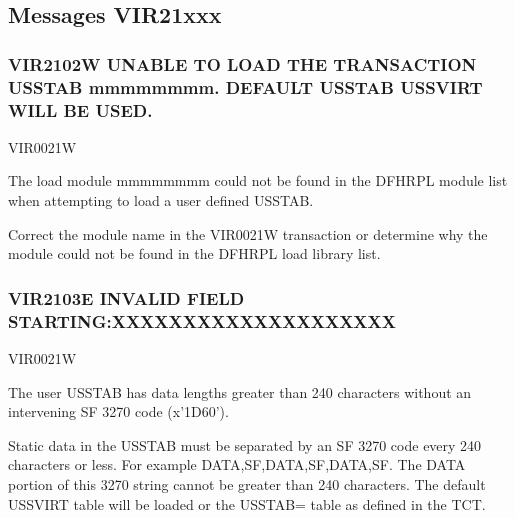 \documentclass[letterpaper,10pt,english]{sphinxmanual}
\begin{document}
\subsection{Messages VIR21xxx}
\label{\detokenize{messages:messages-vir21xxx}}

\subsubsection{VIR2102W UNABLE TO LOAD THE TRANSACTION USSTAB mmmmmmmm. DEFAULT USSTAB USSVIRT WILL BE USED.}
\label{\detokenize{messages:vir2102w-unable-to-load-the-transaction-usstab-mmmmmmmm-default-usstab-ussvirt-will-be-used}}\begin{description}
\sphinxAtStartPar
VIR0021W

\sphinxAtStartPar
The load module mmmmmmmm could not be found in the DFHRPL module list when attempting to load a user defined USSTAB.

\sphinxAtStartPar
Correct the module name in the VIR0021W transaction or determine why the module could not be found in the DFHRPL load library list.

\end{description}


\subsubsection{VIR2103E INVALID FIELD STARTING:XXXXXXXXXXXXXXXXXXXX}
\label{\detokenize{messages:vir2103e-invalid-field-starting-xxxxxxxxxxxxxxxxxxxx}}\begin{description}
\sphinxAtStartPar
VIR0021W

\sphinxAtStartPar
The user USSTAB has data lengths greater than 240 characters without an intervening SF 3270 code (x’1D60’).

\sphinxAtStartPar
Static data in the USSTAB must be separated by an SF 3270 code every 240 characters or less. For example DATA,SF,DATA,SF,DATA,SF. The DATA portion of this 3270 string cannot be greater than 240 characters. The default USSVIRT table will be loaded or the USSTAB= table as defined in the TCT.

\end{description}
\end{document}
